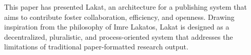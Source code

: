 This paper has presented Lakat, an architecture for a publishing system that aims to contribute foster collaboration, efficiency, and openness. Drawing inspiration from the philosophy of Imre Lakatos, Lakat is designed as a decentralized, pluralistic, and process-oriented system that addresses the limitations of traditional paper-formatted research output.




